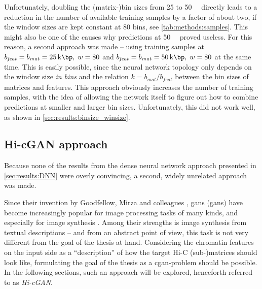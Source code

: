 Unfortunately, doubling the (matrix-)bin sizes from 25 to \SI{50}{\kilo\bp} directly leads to a reduction in the number of available training samples by a factor of about two, 
if the window sizes are kept constant at 80 bins, see \cref{tab:methods:samples}. 
This might also be one of the causes why predictions at \SI{50}{\kilo\bp} proved useless.
For this reason, a second approach was made -- using training samples at $b_\mathit{feat} = b_\mathit{mat} = \SI{25}{\kilo\bp},\;w=80$
and $b_\mathit{feat} = b_\mathit{mat} = \SI{50}{\kilo\bp},\;w=80$ at the same time.
This is easily possible, since the neural network topology only depends on the window size \emph{in bins} and the relation $k=b_\mathit{mat}/b_\mathit{feat}$
between the bin sizes of matrices and features.
This approach obviously increases the number of training samples,
with the idea of allowing the network itself to figure out how to combine predictions at smaller and larger bin sizes.
Unfortunately, this did not work well, as shown in \cref{sec:results:binsize_winsize}.

\subsection{Hi-cGAN approach} \label{sec:improve:Hi-cGAN}
Because none of the results from the dense neural network approach presented in \cref{sec:results:DNN} were overly convincing,
a second, widely unrelated approach was made.

Since their invention by Goodfellow, Mirza and colleagues \cite{Goodfellow2014, mirza2014},
\acrlong{gan}s (\acrshort{gan}s) have become increasingly popular for image processing tasks of many kinds,
and especially for image synthesis \cite{Wang2020}. 
Among their strengths is image synthesis from textual descriptions \cite{Reed2016,Zhang2019c,Zhu2019,Tao2020} --
and from an abstract point of view, this task is not very different from the goal of the thesis at hand.
Considering the chromatin features on the input side as a ``description'' of how the target Hi-C (sub-)matrices should look like,
formulating the goal of the thesis as a \acrshort{cgan}-problem should be possible.
In the following sections, such an approach will be explored, henceforth referred to as \emph{Hi-cGAN}.

